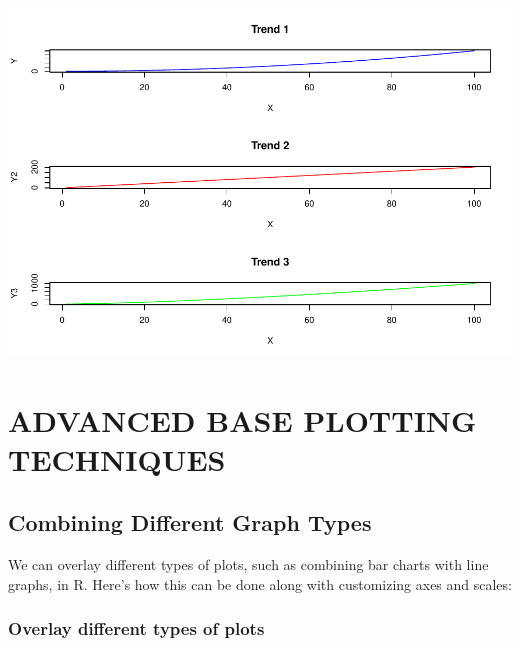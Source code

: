 \documentclass[
]{book}
\begin{document}
\includegraphics{_main_files/figure-latex/unnamed-chunk-51-1.pdf}

\chapter{ADVANCED BASE PLOTTING TECHNIQUES}\label{advanced-base-plotting-techniques}

\section{Combining Different Graph Types}\label{combining-different-graph-types}

We can overlay different types of plots, such as combining bar charts with line graphs, in R. Here's how this can be done along with customizing axes and scales:

\subsection{Overlay different types of plots}\label{overlay-different-types-of-plots}
\end{document}
